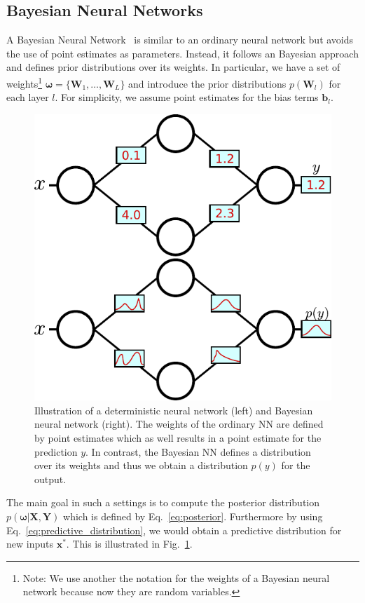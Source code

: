 \documentclass[runningheads]{llncs}
\begin{document}
\subsection{Bayesian Neural Networks}
\label{sec:bayesian_neural_networks}
A Bayesian Neural Network~\cite{mackay1992practical,Neal:1995:BLN:922680} is similar to an ordinary neural network but avoids the use of point estimates as parameters. 
Instead, it follows an Bayesian approach and defines prior distributions over its weights. 
In particular, we have a set of weights\footnote{Note: We use another the notation for the weights of a Bayesian neural network because now they are random variables.} $\boldsymbol{\omega} = \{\mathbf{W}_1,\ldots, \mathbf{W}_L\}$ and introduce the prior distributions $p(\mathbf{W}_l)$ for each layer $l$. 
For simplicity, we assume point estimates for the bias terms $\mathbf{b}_l$. 
\begin{figure}
    \centering
    \includegraphics[width=.55\textwidth]{images/BayesianNeuralNetwork.pdf}
    \caption{Illustration of a deterministic neural network (left) and Bayesian neural network (right). The weights of the ordinary NN are defined by point estimates which as well results in a point estimate for the prediction $y$. In contrast, the Bayesian NN defines a distribution over its weights and thus we obtain a distribution $p(y)$ for the output.}
    \label{fig:bayesian_neural_network}
\end{figure}

The main goal in such a settings is to compute the posterior distribution $p\left(\boldsymbol{\omega} | \mathbf{X}, \mathbf{Y} \right)$ which is defined by Eq.~\ref{eq:posterior}.
Furthermore by using Eq.~\ref{eq:predictive_distribution}, we would obtain a predictive distribution for new inputs $\mathbf{x}^*$.
This is illustrated in Fig.~\ref{fig:bayesian_neural_network}.
\end{document}
